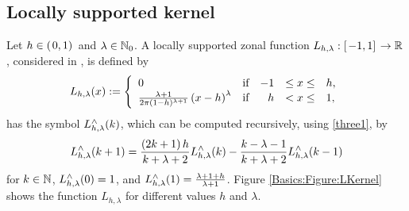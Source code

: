 \documentclass[11pt,a4paper,twoside,bibtotoc]{scrartcl}
\theoremstyle{plain}
\theoremstyle{definition}
\theoremstyle{remark}
\numberwithin{equation}{section}
\numberwithin{table}{section}
\numberwithin{figure}{section}
\begin{document}
\subsection{Locally supported kernel}
  Let $h \in \left(\left.0,1\right)\right.$ and $\lambda \in \mathbb{N}_{0}$.
  A locally supported zonal function $L_{h,\lambda}:\left[\left.-1,1\right]\right.
  \rightarrow \mathbb{R}$, considered in \cite{Sc97}, is defined by
  \[
  \fun{L_{h,\lambda}}{x} := 
  \left\{\begin{array}{l@{\quad \text{if} \quad}rcl} 
      0 & -1 &\le x \le& h, \\
      \frac{\lambda+1}{2\pi(1-h)^{\lambda+1}}\paren{x-h}^{\lambda} &  h & <  x \le& 1,
    \end{array}\right.
  \]
  has the symbol $L_{h,\lambda}^{\wedge}{\hspace{-0.4ex}}\left(k\right)$, which can be computed
  recursively, using \eqref{three1}, by
  \[
  L_{h,\lambda}^{\wedge}{\hspace{-0.4ex}}\left(k+1\right) = \frac{\left(2k+1\right) h}{k+\lambda+2}
  L_{h,\lambda}^{\wedge}{\hspace{-0.4ex}}\left(k\right)   - \frac{k-\lambda-1}{k+\lambda+2}
  L_{h,\lambda}^{\wedge}{\hspace{-0.4ex}}\left(k-1\right)
  \]
  for $k\in \mathbb{N}$, $L_{h,\lambda}^{\wedge}{\hspace{-0.4ex}}\left(0\right) = 1$, and
  $L_{h,\lambda}^{\wedge}{\hspace{-0.4ex}}\left(1\right) = \frac{\lambda + 1 + h}{\lambda+1}$.
  Figure \ref{Basics:Figure:LKernel} shows the function $L_{h,\lambda}$ for
  different values $h$ and $\lambda$.
\end{document}
